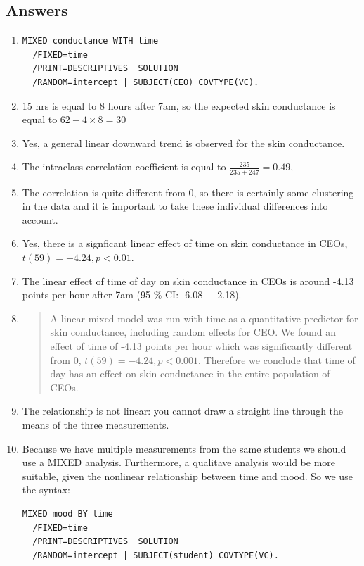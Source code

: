 \documentclass[]{book}\usepackage[]{graphicx}\usepackage[]{color}
\begin{document}
\subsection{Answers}


\begin{enumerate}
\item 
\begin{verbatim}
MIXED conductance WITH time
  /FIXED=time
  /PRINT=DESCRIPTIVES  SOLUTION
  /RANDOM=intercept | SUBJECT(CEO) COVTYPE(VC).
\end{verbatim}
\item 15 hrs is equal to 8 hours after 7am, so the expected skin conductance is equal to $62 - 4 \times 8= 30$\\
\item Yes, a general linear downward trend is observed for the skin conductance.
\item The intraclass correlation coefficient is equal to $\frac{235}{235+247}=0.49$, 
\item The correlation is quite different from 0, so there is certainly some clustering in the data and it is important to take these individual differences into account. \\
\item Yes, there is a signficant linear effect of time on skin conductance in CEOs, $t(59)=-4.24, p < 0.01$.\\
\item The linear effect of time of day on skin conductance in CEOs is around -4.13 points per hour after 7am (95 \% CI: -6.08 -- -2.18). \\
\item \begin{quotation}
        A linear mixed model was run with time as a quantitative predictor for skin conductance, including random effects for CEO. We found an effect of time of -4.13 points per hour which was significantly different from 0, $t(59)=-4.24, p < 0.001$. Therefore we conclude that time of day has an effect on skin conductance in the entire population of CEOs.
        \end{quotation}
        
\item The relationship is not linear: you cannot draw a straight line through the means of the three measurements. 
\item Because we have multiple measurements from the same students we should use a MIXED analysis. Furthermore, a qualitave analysis would be more suitable, given the nonlinear relationship between time and mood. So we use the syntax:

\begin{verbatim}
MIXED mood BY time
  /FIXED=time
  /PRINT=DESCRIPTIVES  SOLUTION
  /RANDOM=intercept | SUBJECT(student) COVTYPE(VC).
\end{verbatim}

\end{enumerate}
\end{document}
